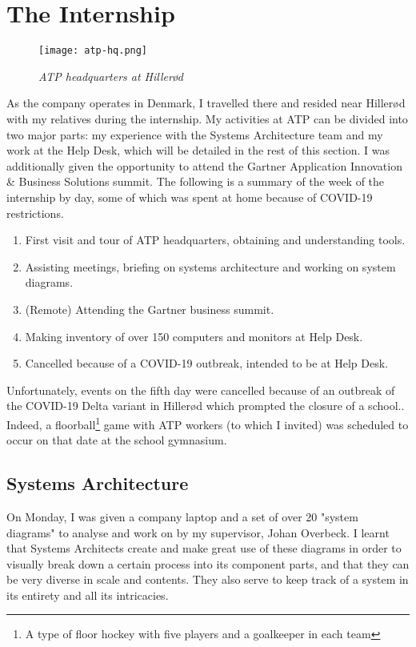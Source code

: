 \section{The Internship}

\begin{figure}[H]
    \centering
        \texttt{[image: atp-hq.png]}
        \caption*{\textit{ATP headquarters at Hillerød\cite{about_atp}}}
\end{figure}

As the company operates in Denmark, I travelled there and resided near Hillerød
with my relatives during the internship. My activities at ATP can be divided
into two major parts: my experience with the Systems Architecture team and my
work at the Help Desk, which will be detailed in the rest of this section. I was
additionally given the opportunity to attend the Gartner Application Innovation
\& Business Solutions summit. The following is a summary of the week of the
internship by day, some of which was spent at home because of COVID-19
restrictions.

\begin{enumerate}
    \item First visit and tour of ATP headquarters, obtaining and understanding
          tools.
    \item Assisting meetings, briefing on systems architecture and working on
          system diagrams.
    \item (Remote) Attending the Gartner business summit.
    \item Making inventory of over 150 computers and monitors at Help Desk.
    \item Cancelled because of a COVID-19 outbreak, intended to be at Help Desk.
\end{enumerate}

Unfortunately, events on the fifth day were cancelled because of an outbreak of
the COVID-19 Delta variant in Hillerød which prompted the closure of a
school.\cite{covid_rip}. Indeed, a floorball\footnote[0]{A type of floor hockey
with five players and a goalkeeper in each team} game with ATP workers (to which
I invited) was scheduled to occur on that date at the school gymnasium.

\subsection{Systems Architecture}

On Monday, I was given a company laptop and a set of over 20 "system diagrams"
to analyse and work on by my supervisor, Johan Overbeck. I learnt that Systems
Architects create and make great use of these diagrams in order to visually
break down a certain process into its component parts, and that they can be very
diverse in scale and contents. They also serve to keep track of a system in its
entirety and all its intricacies.


